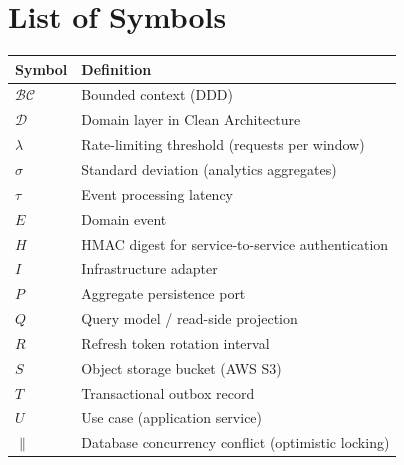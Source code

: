 
\chapter*{List of Symbols}

\begin{longtable}{@{}p{3.2cm} p{10.5cm}@{}}
\textbf{Symbol} & \textbf{Definition} \\[0.3cm]
\endhead

$\mathcal{BC}$ & Bounded context (DDD) \\
$\mathcal{D}$ & Domain layer in Clean Architecture \\
$\lambda$ & Rate-limiting threshold (requests per window) \\
$\sigma$ & Standard deviation (analytics aggregates) \\
$\tau$ & Event processing latency \\
$E$ & Domain event \\
$H$ & HMAC digest for service-to-service authentication \\
$I$ & Infrastructure adapter \\
$P$ & Aggregate persistence port \\
$Q$ & Query model / read-side projection \\
$R$ & Refresh token rotation interval \\
$S$ & Object storage bucket (AWS S3) \\
$T$ & Transactional outbox record \\
$U$ & Use case (application service) \\
$\|$ & Database concurrency conflict (optimistic locking) \\

\end{longtable}

\clearpage
